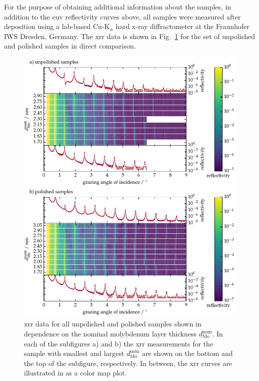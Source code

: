 For the purpose of obtaining additional information about the samples, in addition to the \gls{euv} reflectivity curves above, all samples were measured after deposition using a lab-based Cu-K$_\alpha$ hard x-ray diffractometer at the Fraunhofer IWS Dresden, Germany. The \gls{xrr} data is shown in Fig.~\ref{ch_spec:fig_MoSi_XRR} for the set of unpolished and polished samples in direct comparison.
\begin{figure}[htbp]
\centering
\includegraphics[width=\textwidth]{img/XRR_MoSi}
\caption{\gls{xrr} data for all unpolished and polished samples shown in dependence on the nominal molybdenum layer thickness $d_\text{Mo}^\text{nom}$. In each of the subfigures a) and b) the \gls{xrr} measurements for the sample with smallest and largest $d_\text{Mo}^\text{nom}$ are shown on the bottom and the top of the subfigure, respectively. In between, the \gls{xrr} curves are illustrated in as a color map plot.}
\label{ch_spec:fig_MoSi_XRR}
\end{figure}
